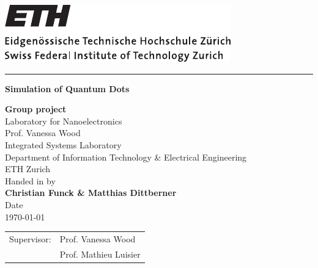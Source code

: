 \newcommand{\trtitle}{Simulation of Quantum Dots}
\newcommand{\trtype}{Group project}
\newcommand{\trprofone}{Prof. Vanessa Wood}
\newcommand{\trproftwo}{Prof. Mathieu Luisier}
\newcommand{\trresearchgroup}{Laboratory for Nanoelectronics}
\newcommand{\trinstitute}{Integrated Systems Laboratory}
\newcommand{\trdepartment}{Department of Information Technology \& Electrical Engineering}
\newcommand{\truni}{ETH Zurich}
\newcommand{\trdate}{\today}

\thispagestyle{empty}

\includegraphics[scale=0.8]{Fig/eth_logo_black.pdf}

\rule{\textwidth}{0.4pt}

\vspace{2.5cm}
\begin{center}
  \textbf{\LARGE \trtitle}
\end{center}
\vspace{2cm}

\begin{center}
  \textbf{\trtype}	\\
  \trresearchgroup	\\
  \trprofone				\\
  \trinstitute			\\
  \trdepartment			\\
  \truni						\\[0.5cm]
  Handed in by			\\
  \textbf{Christian Funck \& Matthias Dittberner}	\\[0.5cm]
  Date							\\
  \trdate						\\
\end{center}

\vspace{1cm}

\begin{center}
	\begin{tabular}{ll}
		Supervisor: & \trprofone	\\
								& \trproftwo	\\
	\end{tabular}
\end{center}

\vfill

